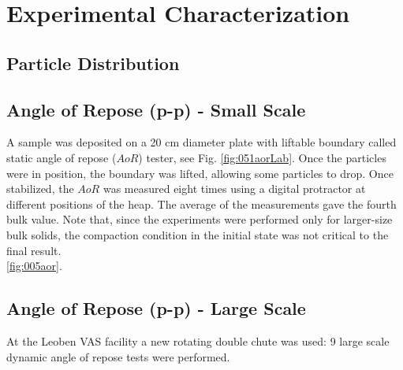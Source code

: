 
\chapter[Experimental Characterization]{Experimental Characterization}
\label{cap:experimentalcharacterization}

\lipsum[1]



\section{Particle Distribution}
\label{sec:particledistribution}


\section{Angle of Repose (p-p) - Small Scale}
\label{sec:aor}

A sample was deposited on a 20 cm diameter plate with liftable boundary called
static angle of repose ($AoR$) tester, see Fig. \ref{fig:051aorLab}.
Once the particles were in position, the boundary was lifted, allowing some particles to drop. 
Once stabilized, the $AoR$ was measured eight times using a digital protractor at different positions of the heap. 
The average of the measurements gave the fourth bulk value.
Note that, since the experiments were performed only for larger-size bulk
solids, the compaction condition in the initial state was not critical to the
final result.\\

\ref{fig:005aor}.\\


\section{Angle of Repose (p-p) - Large Scale}
\label{sec:aorlargescale}

At the Leoben VAS facility a new rotating double chute was used: 
9 large scale dynamic angle of repose tests were performed. 


